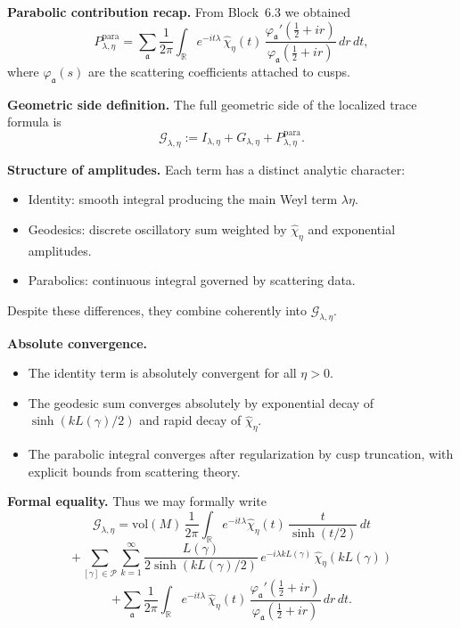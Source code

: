 \medskip

\noindent\textbf{Parabolic contribution recap.}
From Block~6.3 we obtained
\[
  P_{\lambda,\eta}^{\mathrm{para}}
  = \sum_{\mathfrak{a}} \frac{1}{2\pi}\int_{\mathbb{R}}
  e^{-it\lambda}\,\widehat{\chi}_\eta(t)\,
  \frac{\varphi_\mathfrak{a}'(\tfrac12+ir)}{\varphi_\mathfrak{a}(\tfrac12+ir)}\, dr\, dt,
\]
where $\varphi_\mathfrak{a}(s)$ are the scattering coefficients attached to cusps.

\medskip

\noindent\textbf{Geometric side definition.}
The full geometric side of the localized trace formula is
\[
  \mathcal{G}_{\lambda,\eta}
  := I_{\lambda,\eta} + G_{\lambda,\eta} + P_{\lambda,\eta}^{\mathrm{para}}.
\]

\medskip

\noindent\textbf{Structure of amplitudes.}
Each term has a distinct analytic character:
\begin{itemize}
  \item Identity: smooth integral producing the main Weyl term $\lambda\eta$.
  \item Geodesics: discrete oscillatory sum weighted by $\widehat{\chi}_\eta$ and exponential amplitudes.
  \item Parabolics: continuous integral governed by scattering data.
\end{itemize}
Despite these differences, they combine coherently into $\mathcal{G}_{\lambda,\eta}$.

\medskip

\noindent\textbf{Absolute convergence.}
\begin{itemize}
  \item The identity term is absolutely convergent for all $\eta>0$.
  \item The geodesic sum converges absolutely by exponential decay of $\sinh(kL(\gamma)/2)$ and rapid decay of $\widehat{\chi}_\eta$.
  \item The parabolic integral converges after regularization by cusp truncation, with explicit bounds from scattering theory.
\end{itemize}

\medskip

\noindent\textbf{Formal equality.}
Thus we may formally write
\[
  \mathcal{G}_{\lambda,\eta}
  = \mathrm{vol}(M)\, \frac{1}{2\pi}\int_{\mathbb{R}} e^{-it\lambda}
  \widehat{\chi}_\eta(t)\,\frac{t}{\sinh(t/2)}\, dt
\]
\[
  + \sum_{[\gamma]\in \mathcal{P}} \sum_{k=1}^\infty
  \frac{L(\gamma)}{2\sinh(kL(\gamma)/2)}\, e^{-i\lambda kL(\gamma)}\, \widehat{\chi}_\eta(kL(\gamma))
\]
\[
  + \sum_{\mathfrak{a}} \frac{1}{2\pi}\int_{\mathbb{R}}
  e^{-it\lambda}\,\widehat{\chi}_\eta(t)\,
  \frac{\varphi_\mathfrak{a}'(\tfrac12+ir)}{\varphi_\mathfrak{a}(\tfrac12+ir)}\, dr\, dt.
\]

